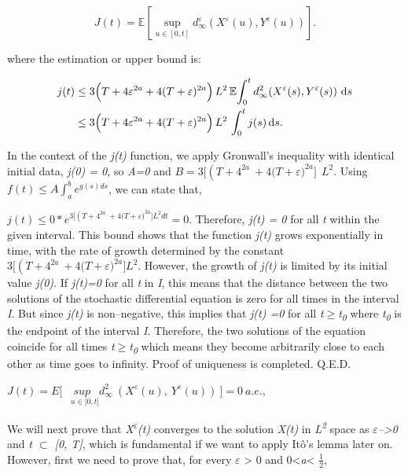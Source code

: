 \documentclass[12pt,a4paper]{report}
\numberwithin{equation}{section}
\begin{document}
\[
J(t)=\mathbb{E}\!\left[\sup_{u\in[0,t]}
d_{\infty}^{\varepsilon}\!\left(X^{\varepsilon}(u),Y^{\varepsilon}(u)\right)\right].
\]

where the estimation or upper bound is:

\[
\begin{aligned}
j(t)
&\le 3\Bigl(T+4\varepsilon^{2a}+4(T+\varepsilon)^{2a}\Bigr)\,L^{2}\,
\mathbb{E}\!\int_{0}^{t} d_{\infty}^{2}\!\left(X^{\varepsilon}(s),Y^{\varepsilon}(s)\right)\,\mathrm{d}s \\
&\le 3\Bigl(T+4\varepsilon^{2a}+4(T+\varepsilon)^{2a}\Bigr)\,L^{2}\,
\int_{0}^{t} j(s)\,\mathrm{d}s .
\end{aligned}
\]


In the context of the \emph{j(t)} function, we apply Gronwall's
inequality with identical initial data, \emph{j(0) = 0,} so \emph{A=0}
and
\(B = 3\lbrack\left( T + 4^{2a} \right.\  + 4(T + {\varepsilon)}^{2a}\rbrack\ {\ L}^{2}\).
Using \(f(t) \leq A\int_{a}^{b}e^{g(s)ds}\), we can state that,

\(j(t) \leq 0*e^{3\lbrack\left( T + 4^{2a} \right.\  + 4(T + {\varepsilon)}^{2a}\rbrack L^{2}dt} = 0\).
Therefore, \emph{j(t) = 0} for all \emph{t} within the given interval.
This bound shows that the function \emph{j(t)} grows exponentially in
time, with the rate of growth determined by the constant
\(3\lbrack\left( T + 4^{2a} \right.\  + 4(T + {\varepsilon)}^{2a}\rbrack L^{2}\).
However, the growth of \emph{j(t)} is limited by its initial value
\emph{j(0)}. If \emph{j(t)=0} for all \emph{t} in \emph{I}, this means
that the distance between the two solutions of the stochastic
differential equation is zero for all times in the interval \emph{I}.
But since \emph{j(t)} is non--negative, this implies that \emph{j(t) =0}
for all \emph{t$\geq$t\textsubscript{0}}\textsubscript{} where
\emph{t\textsubscript{0}} is the endpoint of the interval \emph{I}.
Therefore, the two solutions of the equation coincide for all times
\emph{t$\geq$t\textsubscript{0}}\textsubscript{} which means they become
arbitrarily close to each other as time goes to infinity. Proof of
uniqueness is completed. Q.E.D.

\({J(t) = E\lbrack\underset{\ \ \ \ \ u \in \lbrack 0,t\rbrack}{\ sup}}{d_{\infty}^{2}\ \left( X^{\varepsilon}(u),\ Y^{\varepsilon}(u) \right)\ }\rbrack = 0\ a.e.,\)

We will next prove that \emph{X\textsuperscript{$\varepsilon$}(t)} converges to the
solution \emph{X(t)} in \emph{L\textsuperscript{2}} space as
\emph{$\varepsilon$--\textgreater0} and \emph{t $\subset$ {[}0, T{]}}, which is fundamental
if we want to apply Itô's lemma later on. However, first we need to
prove that, for every \emph{$\varepsilon$} \textgreater{} 0 and
0\textless{}\emph{a}\textless{} $\frac{1}{2}$,
\end{document}
